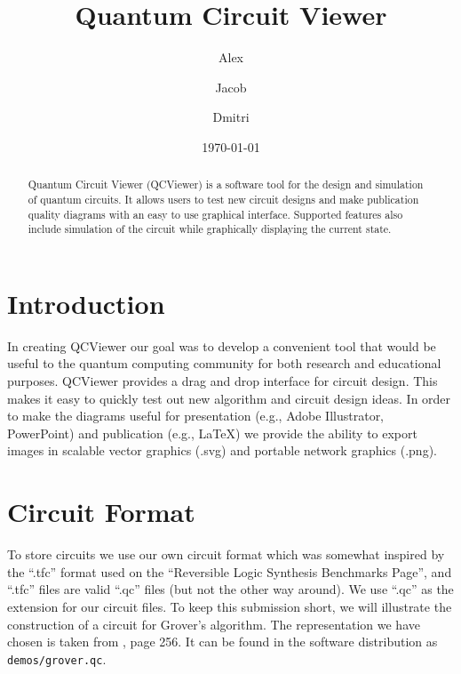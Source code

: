 \documentclass[aps,prl,reprint,floatfix,superscriptaddress]{revtex4-1} %
\begin{document}

\title{Quantum Circuit Viewer}
\date{\today}
\author{Alex }
\author{Jacob }
\author{Dmitri }
\begin{abstract}
Quantum Circuit Viewer (QCViewer) is a software tool for the design and simulation of 
quantum circuits.  It allows users to test new circuit designs and make publication 
quality diagrams with an easy to use graphical interface.  Supported features also include
simulation of the circuit while graphically displaying the current state.
\end{abstract}
\maketitle

\section{Introduction}
In creating QCViewer our goal was to develop a convenient tool that would be useful to
the quantum computing community for both research and educational purposes. QCViewer 
provides a drag and drop interface for circuit design.  This makes it easy to quickly
test out new algorithm and circuit design ideas.  In order to make the diagrams useful for presentation 
(e.g., Adobe Illustrator, PowerPoint) and publication (e.g., LaTeX) we provide the ability to export images in scalable
vector graphics (.svg) and portable network graphics (.png).
\section{Circuit Format}
To store circuits we use our own circuit format which was somewhat 
inspired by the ``.tfc'' format used on the ``Reversible Logic Synthesis Benchmarks Page''\cite{maslovBench}, and ``.tfc'' files are valid ``.qc'' files (but not the other way around).
We use ``.qc'' as the extension for our circuit files.
To keep this submission short, we will illustrate the construction of a circuit for Grover's algorithm.  The representation we have chosen is 
taken from \cite{nielsen2000quantum}, page 256. It can be found in the software distribution as \verb+demos/grover.qc+.
\end{document}
